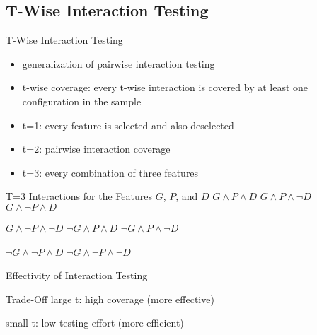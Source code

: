 \subsection{T-Wise Interaction Testing}
\begin{frame}{\insertsubsection}
	\begin{fancycolumns}
		\begin{definition}{T-Wise Interaction Testing}
			\begin{itemize}
				\item generalization of pairwise interaction testing
				\item t-wise coverage: every t-wise interaction is covered by at least one configuration in the sample
				\item t=1: every feature is selected and also deselected
				\item t=2: pairwise interaction coverage
				\item t=3: every combination of three features
			\end{itemize}
		\end{definition}
		\begin{example}{{T=3 Interactions for the Features $G$, $P$, and $D$}}
			$G \wedge P \wedge D$ \hfill $G \wedge P \wedge \neg D$ \hfill $G \wedge \neg P \wedge D$
			
			$G \wedge \neg P \wedge \neg D$ \hfill $\neg G \wedge P \wedge D$ \hfill $\neg G \wedge P \wedge \neg D$
			
			$\neg G \wedge \neg P \wedge D$ \hfill $\neg G \wedge \neg P \wedge \neg D$
		\end{example}
		\nextcolumn
		\begin{exampletight}{Effectivity of Interaction Testing }
			\footnotesize
		\end{exampletight}
		\begin{note}{Trade-Off}
			large t: high coverage (more effective)
			
			small t: low testing effort (more efficient)
		\end{note}
	\end{fancycolumns}
\end{frame}

